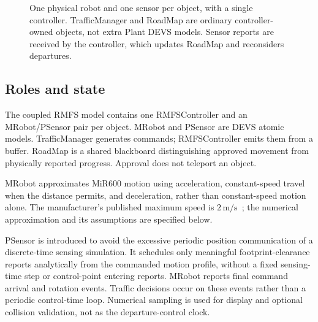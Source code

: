 \documentclass[11pt,a4paper]{article}
\theoremstyle{remark}
\begin{document}
\begin{figure}[htbp]
\centering
{}
\caption{One physical robot and one sensor per object, with a single controller.
TrafficManager and RoadMap are ordinary controller-owned objects, not extra
Plant DEVS models. Sensor reports are received by the controller, which
updates RoadMap and reconsiders departures.}
\label{fig:architecture}
\end{figure}

\subsection{Roles and state}
The coupled RMFS model contains one RMFSController and an MRobot/PSensor
pair per object. MRobot and PSensor are DEVS atomic models. TrafficManager
generates commands; RMFSController emits them from a buffer. RoadMap is a
shared blackboard distinguishing approved movement from physically reported
progress. Approval does not teleport an object.

MRobot approximates MiR600 motion using acceleration, constant-speed travel
when the distance permits, and deceleration, rather than constant-speed
motion alone. The manufacturer's published maximum speed is
$2\,\mathrm{m/s}$~\cite{mir600}; the numerical approximation and its assumptions
are specified below.

PSensor is introduced to avoid the excessive periodic position communication
of a discrete-time sensing simulation. It schedules only meaningful
footprint-clearance reports analytically from the commanded motion profile,
without a fixed sensing-time step or control-point entering reports.
MRobot reports final command arrival and rotation
events. Traffic decisions occur on these events rather than a periodic
control-time loop. Numerical sampling is used for display and optional
collision validation, not as the departure-control clock.
\end{document}
